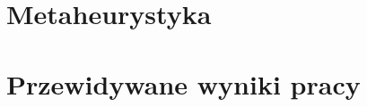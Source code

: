 \documentclass[12pt,a4paper]{article}
\begin{document}
\section{Metaheurystyka}

\section{Przewidywane wyniki pracy}
\end{document}
